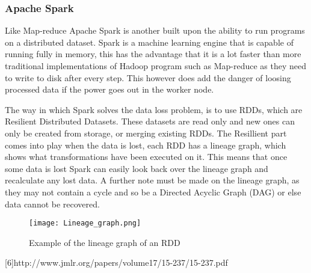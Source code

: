 \subsubsection{Apache Spark}
Like Map-reduce Apache Spark is another built upon the ability to run programs
on a distributed dataset. Spark is a machine learning engine that is capable of
running fully in memory\cite{Sparkwebsite}, this has the advantage that it is a lot faster than
more traditional implementations of Hadoop program such as Map-reduce as they need
to write to disk after every step. This however does add the danger of loosing processed data
 if the power goes out in the worker node.

The way in which Spark solves the data loss problem, is to use RDDs, which are
Resilient Distributed Datasets. These datasets are read only and new ones can
only be created from storage, or merging existing RDDs\cite{Zaha12}. The Resillient part comes
into play when the data is lost, each RDD has a lineage graph, which shows what
transformations have been executed on it. This means that once some data is lost
Spark can easily look back over the lineage graph and recalculate any lost data.
A further note must be made on the lineage graph, as they may not contain a cycle
and so be a Directed Acyclic Graph (DAG) or else data cannot be recovered.

\begin{figure}
  \texttt{[image: Lineage\_graph.png]}
  \caption{Example of the lineage graph of an RDD\cite{Zaha12}}
  \label{lineagegraph}
\end{figure}




[6]http://www.jmlr.org/papers/volume17/15-237/15-237.pdf %
